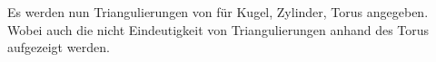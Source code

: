 

\begin{Bsp}
  Es werden nun Triangulierungen von für Kugel, Zylinder, Torus angegeben.
  Wobei auch die nicht Eindeutigkeit von Triangulierungen anhand des Torus
  aufgezeigt werden.
\end{Bsp}

\begin{Bsp}[Triangulation]
\end{Bsp}
























